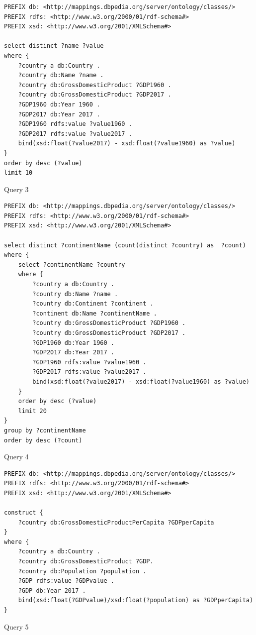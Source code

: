 \documentclass[11pt]{article}
\begin{document}
\begin{listing}[!hbt]
\begin{verbatim}
PREFIX db: <http://mappings.dbpedia.org/server/ontology/classes/>
PREFIX rdfs: <http://www.w3.org/2000/01/rdf-schema#> 
PREFIX xsd: <http://www.w3.org/2001/XMLSchema#>

select distinct ?name ?value
where { 
    ?country a db:Country .
    ?country db:Name ?name .
    ?country db:GrossDomesticProduct ?GDP1960 .
    ?country db:GrossDomesticProduct ?GDP2017 .
    ?GDP1960 db:Year 1960 .
    ?GDP2017 db:Year 2017 .
    ?GDP1960 rdfs:value ?value1960 .
    ?GDP2017 rdfs:value ?value2017 .
    bind(xsd:float(?value2017) - xsd:float(?value1960) as ?value)
} 
order by desc (?value)
limit 10
\end{verbatim}
\caption{Query 3}
\label{listing:query3}
\end{listing}

\begin{listing}[!hbt]
\begin{verbatim}
PREFIX db: <http://mappings.dbpedia.org/server/ontology/classes/>
PREFIX rdfs: <http://www.w3.org/2000/01/rdf-schema#>
PREFIX xsd: <http://www.w3.org/2001/XMLSchema#>

select distinct ?continentName (count(distinct ?country) as  ?count)
where {
    select ?continentName ?country
    where {
        ?country a db:Country .
        ?country db:Name ?name .
        ?country db:Continent ?continent .
        ?continent db:Name ?continentName .
        ?country db:GrossDomesticProduct ?GDP1960 .
        ?country db:GrossDomesticProduct ?GDP2017 .
        ?GDP1960 db:Year 1960 .
        ?GDP2017 db:Year 2017 .
        ?GDP1960 rdfs:value ?value1960 .
        ?GDP2017 rdfs:value ?value2017 .
        bind(xsd:float(?value2017) - xsd:float(?value1960) as ?value)
    }
    order by desc (?value)
    limit 20
}
group by ?continentName
order by desc (?count)
\end{verbatim}
\caption{Query 4}
\label{listing:query4}
\end{listing}
    
\begin{listing}[!hbt]
\begin{verbatim}
PREFIX db: <http://mappings.dbpedia.org/server/ontology/classes/>
PREFIX rdfs: <http://www.w3.org/2000/01/rdf-schema#>
PREFIX xsd: <http://www.w3.org/2001/XMLSchema#>

construct {
    ?country db:GrossDomesticProductPerCapita ?GDPperCapita 
}
where {
    ?country a db:Country .    
    ?country db:GrossDomesticProduct ?GDP.
    ?country db:Population ?population .
    ?GDP rdfs:value ?GDPvalue .
    ?GDP db:Year 2017 .
    bind(xsd:float(?GDPvalue)/xsd:float(?population) as ?GDPperCapita) 
}
\end{verbatim}
\caption{Query 5}
\label{listing:query5}
\end{listing}
\end{document}
